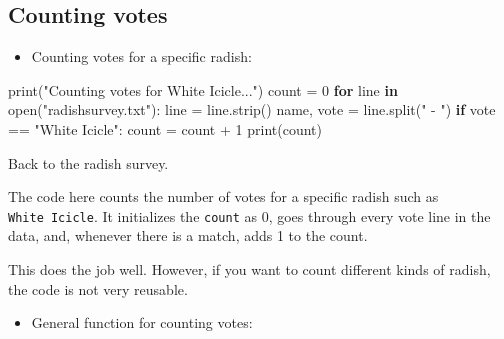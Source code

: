 \documentclass[
  letterpaper,
]{scrbook}
\newenvironment{Shaded}{\begin{snugshade}}{\end{snugshade}}
\newcommand{\BuiltInTok}[1]{\textcolor[rgb]{0.00,0.23,0.31}{#1}}
\newcommand{\ControlFlowTok}[1]{\textcolor[rgb]{0.00,0.23,0.31}{\textbf{#1}}}
\newcommand{\DecValTok}[1]{\textcolor[rgb]{0.68,0.00,0.00}{#1}}
\newcommand{\KeywordTok}[1]{\textcolor[rgb]{0.00,0.23,0.31}{\textbf{#1}}}
\newcommand{\NormalTok}[1]{\textcolor[rgb]{0.00,0.23,0.31}{#1}}
\newcommand{\OperatorTok}[1]{\textcolor[rgb]{0.37,0.37,0.37}{#1}}
\newcommand{\StringTok}[1]{\textcolor[rgb]{0.13,0.47,0.30}{#1}}
\providecommand{\tightlist}{%
  \setlength{\itemsep}{0pt}\setlength{\parskip}{0pt}}
\begin{document}
\subsection*{Counting votes}\label{counting-votes}

\begin{itemize}
\tightlist
\item
  Counting votes for a specific radish:
\end{itemize}

\begin{Shaded}
\begin{Highlighting}[]
\BuiltInTok{print}\NormalTok{(}\StringTok{"Counting votes for White Icicle..."}\NormalTok{)}
\NormalTok{count }\OperatorTok{=} \DecValTok{0}
\ControlFlowTok{for}\NormalTok{ line }\KeywordTok{in} \BuiltInTok{open}\NormalTok{(}\StringTok{"radishsurvey.txt"}\NormalTok{):}
\NormalTok{   line }\OperatorTok{=}\NormalTok{ line.strip()}
\NormalTok{   name, vote }\OperatorTok{=}\NormalTok{ line.split(}\StringTok{" {-} "}\NormalTok{)}
   \ControlFlowTok{if}\NormalTok{ vote }\OperatorTok{==} \StringTok{"White Icicle"}\NormalTok{:}
\NormalTok{      count }\OperatorTok{=}\NormalTok{ count }\OperatorTok{+} \DecValTok{1}
\BuiltInTok{print}\NormalTok{(count)}
\end{Highlighting}
\end{Shaded}

Back to the radish survey.

The code here counts the number of votes for a specific radish such as
\texttt{White\ Icicle}. It initializes the \texttt{count} as 0, goes
through every vote line in the data, and, whenever there is a match,
adds 1 to the count.

This does the job well. However, if you want to count different kinds of
radish, the code is not very reusable.

\begin{itemize}
\tightlist
\item
  General function for counting votes:
\end{itemize}
\end{document}
